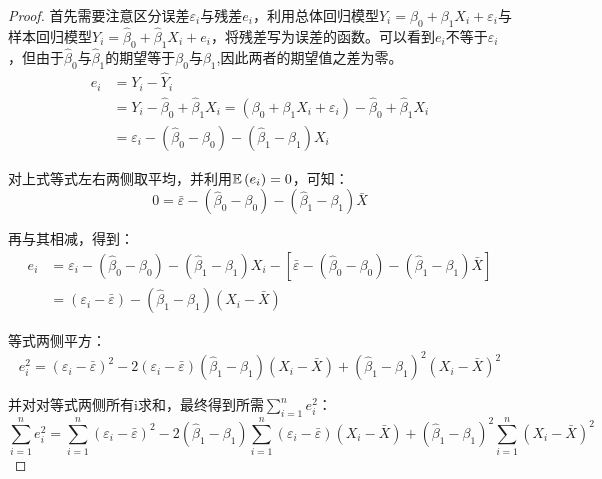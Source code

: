 \documentclass[11pt]{article}
\begin{document}
\begin{proof}
    首先需要注意区分误差$\varepsilon_i$与残差$e_i$，利用总体回归模型$Y_i = \beta_0 + \beta_1 X_i + \varepsilon_i$与样本回归模型$Y_i = \hat{\beta}_0 + \hat{\beta}_1 X_i + e_i$，将残差写为误差的函数。可以看到$e_i$不等于$\varepsilon_i$，但由于$\hat{\beta}_0$与$\hat{\beta}_1$的期望等于$\beta_0$与$\beta_1$,因此两者的期望值之差为零。
    \begin{align*}
        e_i &= Y_i - \hat{Y}_i \\
        &= Y_i - \hat{\beta}_0 + \hat{\beta}_1 X_i 
        = \left( \beta_0 + \beta_1 X_i + \varepsilon_i \right) - \hat{\beta}_0 + \hat{\beta}_1 X_i \\
        &= \varepsilon_i - \left( \hat{\beta}_0 - \beta_0 \right) - \left( \hat{\beta}_1 - \beta_1 \right) X_i
    \end{align*}
    
    对上式等式左右两侧取平均，并利用$\mathbb{E}\left(e_i\right)=0$，可知：
    \begin{equation*}
        0 = \bar{\varepsilon} - \left( \hat{\beta}_0 - \beta_0 \right) - \left( \hat{\beta}_1 - \beta_1 \right) \bar{X}
    \end{equation*}

    再与其相减，得到：
    \begin{align*}
        e_i &= \varepsilon_i - \left( \hat{\beta}_0 - \beta_0 \right) - \left( \hat{\beta}_1 - \beta_1 \right) X_i - \left[ \bar{\varepsilon} - \left( \hat{\beta}_0 - \beta_0 \right) - \left( \hat{\beta}_1 - \beta_1 \right) \bar{X} \right] \\
        &= \left( \varepsilon_i - \bar{\varepsilon} \right) - \left( \hat{\beta}_1 - \beta_1 \right) \left( X_i - \bar{X} \right)
    \end{align*}

    等式两侧平方：
    \begin{equation*}
        e_i^2 = 
        \left( \varepsilon_i - \bar{\varepsilon} \right)^2
        - 2\left( \varepsilon_i - \bar{\varepsilon} \right) \left( \hat{\beta}_1 - \beta_1 \right) \left( X_i - \bar{X} \right)
        + \left( \hat{\beta}_1 - \beta_1 \right)^2 \left(X_i - \bar{X}\right)^2
    \end{equation*}

    并对对等式两侧所有i求和，最终得到所需$\sum_{i=1}^{n} e_i^2$：
    \begin{equation*}
        \sum_{i=1}^{n} e_i^2 = 
        \sum_{i=1}^{n} \left( \varepsilon_i - \bar{\varepsilon} \right)^2 
        - 2 \left( \hat{\beta}_1 - \beta_1 \right) \sum_{i=1}^{n} \left( \varepsilon_i - \bar{\varepsilon} \right) \left( X_i - \bar{X} \right)
        + \left( \hat{\beta}_1 - \beta_1 \right)^2 \sum_{i=1}^{n} \left( X_i - \bar{X} \right)^2
    \end{equation*}


\end{proof}
\end{document}
